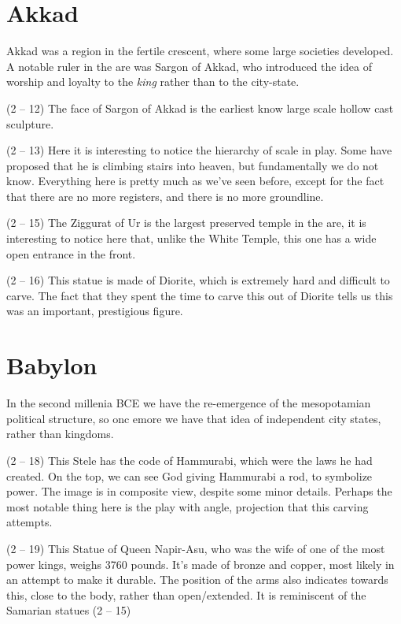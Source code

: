 \documentclass{article}
\begin{document}
    \begin{spacing}{1.2}
    \newpage
    \section{Akkad}
    Akkad was a region in the fertile crescent, where some large societies 
    developed. A notable ruler in the are was Sargon of Akkad, who introduced 
    the idea of worship and loyalty to the \emph{king} rather than to the 
    city-state.

    (2 -- 12) The face of Sargon of Akkad is the earliest know large scale 
    hollow cast sculpture.
    

    (2 -- 13) Here it is interesting to notice the hierarchy of scale in play. 
    Some have proposed that he is climbing stairs into heaven, but fundamentally
    we do not know. Everything here is pretty much as we've seen before, except 
    for the fact that there are no more registers, and there is no more 
    groundline.
    
    (2 -- 15) The Ziggurat of Ur is the largest preserved temple in the are, 
    it is interesting to notice here that, unlike the White Temple, this one has
    a wide open entrance in the front.
    
    (2 -- 16) This statue is made of Diorite, which is extremely hard and 
    difficult to carve. The fact that they spent the time to carve this out of
    Diorite tells us this was an important, prestigious figure.

    \section{Babylon}
    In the second millenia BCE we have the re-emergence of the mesopotamian 
    political structure, so onc emore we have that idea of independent city 
    states, rather than kingdoms.
    
    (2 -- 18) This Stele has the code of Hammurabi, which were the laws he had 
    created. On the top, we can see God giving Hammurabi a rod, to symbolize 
    power. The image is in composite view, despite some minor details. Perhaps 
    the most notable thing here is the play with angle, projection that this 
    carving attempts.
    
    (2 -- 19) This Statue of Queen Napir-Asu, who was the wife of one of the 
    most power kings, weighs 3760 pounds. It's made of bronze and copper,
    most likely in an attempt to make it durable. The position of the arms 
    also indicates towards this, close to the body, rather than open/extended.
    It is reminiscent of the Samarian statues (2 -- 15)


\end{spacing}
\end{document}
